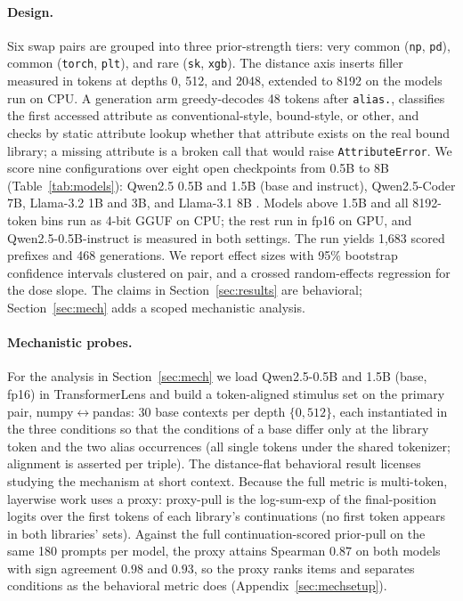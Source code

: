 \documentclass[11pt]{article}
\begin{document}
\paragraph{Design.} Six swap pairs are grouped into three prior-strength tiers: very common (\texttt{np}, \texttt{pd}), common (\texttt{torch}, \texttt{plt}), and rare (\texttt{sk}, \texttt{xgb}). The distance axis inserts filler measured in tokens at depths 0, 512, and 2048, extended to 8192 on the models run on CPU. A generation arm greedy-decodes 48 tokens after \texttt{alias.}, classifies the first accessed attribute as conventional-style, bound-style, or other, and checks by static attribute lookup whether that attribute exists on the real bound library; a missing attribute is a broken call that would raise \texttt{AttributeError}. We score nine configurations over eight open checkpoints from 0.5B to 8B (Table~\ref{tab:models}): Qwen2.5 0.5B and 1.5B (base and instruct), Qwen2.5-Coder 7B, Llama-3.2 1B and 3B, and Llama-3.1 8B \citep{qwen2025qwen25,grattafiori2024llama3}. Models above 1.5B and all 8192-token bins run as 4-bit GGUF on CPU; the rest run in fp16 on GPU, and Qwen2.5-0.5B-instruct is measured in both settings. The run yields 1{,}683 scored prefixes and 468 generations. We report effect sizes with 95\% bootstrap confidence intervals clustered on pair, and a crossed random-effects regression for the dose slope. The claims in Section~\ref{sec:results} are behavioral; Section~\ref{sec:mech} adds a scoped mechanistic analysis.

\paragraph{Mechanistic probes.} For the analysis in Section~\ref{sec:mech} we load Qwen2.5-0.5B and 1.5B (base, fp16) in TransformerLens \citep{nanda2022transformerlens} and build a token-aligned stimulus set on the primary pair, numpy$\leftrightarrow$pandas: 30 base contexts per depth $\{0, 512\}$, each instantiated in the three conditions so that the conditions of a base differ only at the library token and the two alias occurrences (all single tokens under the shared tokenizer; alignment is asserted per triple). The distance-flat behavioral result licenses studying the mechanism at short context. Because the full metric is multi-token, layerwise work uses a proxy: proxy-pull is the log-sum-exp of the final-position logits over the first tokens of each library's continuations (no first token appears in both libraries' sets). Against the full continuation-scored prior-pull on the same 180 prompts per model, the proxy attains Spearman $0.87$ on both models with sign agreement $0.98$ and $0.93$, so the proxy ranks items and separates conditions as the behavioral metric does (Appendix~\ref{sec:mechsetup}).
\end{document}
